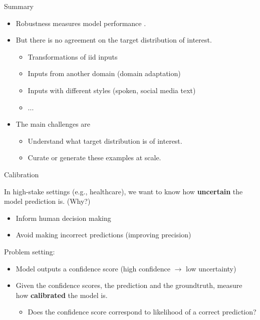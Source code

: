 \documentclass[usenames,dvipsnames,notes,11pt,aspectratio=169,hyperref={colorlinks=true, linkcolor=blue}]{beamer}
\begin{document}
\begin{frame}
    {Summary}

    \begin{itemize}
        \item Robustness measures model performance .
        \item But there is no agreement on the target distribution of interest.
            \begin{itemize}
                \item Transformations of iid inputs
                \item Inputs from another domain (domain adaptation)
                \item Inputs with different styles (spoken, social media text)
                \item ...
            \end{itemize}
            \pause
        \item The main challenges are
            \begin{itemize}
                \item Understand what target distribution is of interest.
                \item Curate or generate these examples at scale. 
            \end{itemize}
    \end{itemize}
\end{frame}


\begin{frame}
    {Calibration}

    In high-stake settings (e.g., healthcare), we want to know how \textbf{uncertain} the model prediction is. (Why?) \\\pause
    \begin{itemize}
        \item Inform human decision making
        \item Avoid making incorrect predictions (improving precision)
    \end{itemize}

    \pause
    Problem setting:\\
    \begin{itemize}
        \item Model outputs a confidence score (high confidence $\rightarrow$ low uncertainty)
        \item Given the confidence scores, the prediction and the groundtruth, measure how \textbf{calibrated} the model is.
            \begin{itemize}
                \item Does the confidence score correspond to likelihood of a correct prediction?
            \end{itemize}
    \end{itemize}
\end{frame}
\end{document}
